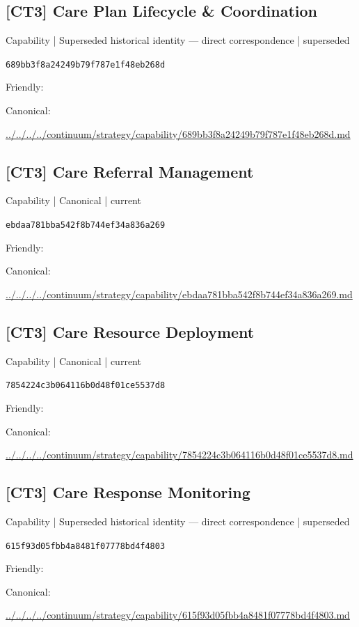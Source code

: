 \documentclass[10pt,a4paper]{article}
\begin{document}
\subsection*{[CT3] Care Plan Lifecycle \& Coordination}
{\small Capability | Superseded historical identity — direct correspondence | superseded}\par
\texttt{689bb3f8a24249b79f787e1f48eb268d}\par
Friendly: \par
Canonical: \par
{\footnotesize\url{../../../../continuum/strategy/capability/689bb3f8a24249b79f787e1f48eb268d.md}}\par
\subsection*{[CT3] Care Referral Management}
{\small Capability | Canonical | current}\par
\texttt{ebdaa781bba542f8b744ef34a836a269}\par
Friendly: \par
Canonical: \par
{\footnotesize\url{../../../../continuum/strategy/capability/ebdaa781bba542f8b744ef34a836a269.md}}\par
\subsection*{[CT3] Care Resource Deployment}
{\small Capability | Canonical | current}\par
\texttt{7854224c3b064116b0d48f01ce5537d8}\par
Friendly: \par
Canonical: \par
{\footnotesize\url{../../../../continuum/strategy/capability/7854224c3b064116b0d48f01ce5537d8.md}}\par
\subsection*{[CT3] Care Response Monitoring}
{\small Capability | Superseded historical identity — direct correspondence | superseded}\par
\texttt{615f93d05fbb4a8481f07778bd4f4803}\par
Friendly: \par
Canonical: \par
{\footnotesize\url{../../../../continuum/strategy/capability/615f93d05fbb4a8481f07778bd4f4803.md}}\par
\end{document}
